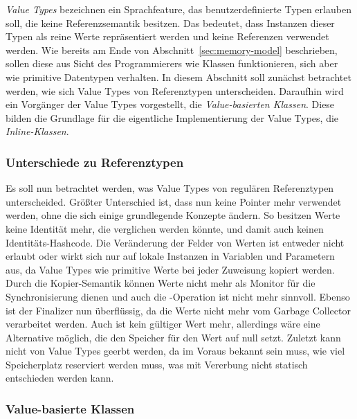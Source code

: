 \emph{Value Types} bezeichnen ein Sprachfeature, das benutzerdefinierte Typen erlauben soll, die keine Referenzsemantik besitzen.
Das bedeutet, dass Instanzen dieser Typen als reine Werte repräsentiert werden und keine Referenzen verwendet werden.
Wie bereits am Ende von Abschnitt~\ref{sec:memory-model} beschrieben, sollen diese aus Sicht des Programmierers wie Klassen funktionieren, sich aber wie primitive Datentypen verhalten.
In diesem Abschnitt soll zunächst betrachtet werden, wie sich Value Types von Referenztypen unterscheiden.
Daraufhin wird ein Vorgänger der Value Types vorgestellt, die \emph{Value-basierten Klassen}.
Diese bilden die Grundlage für die eigentliche Implementierung der Value Types, die \emph{Inline-Klassen}.

\subsubsection{Unterschiede zu Referenztypen}

Es soll nun betrachtet werden, was Value Types von regulären Referenztypen unterscheided.
Größter Unterschied ist, dass nun keine Pointer mehr verwendet werden, ohne die sich einige grundlegende Konzepte ändern.
So besitzen Werte keine Identität mehr, die verglichen werden könnte, und damit auch keinen Identitäts-Hashcode.
Die Veränderung der Felder von Werten ist entweder nicht erlaubt oder wirkt sich nur auf lokale Instanzen in Variablen und Parametern aus, da Value Types wie primitive Werte bei jeder Zuweisung kopiert werden.
Durch die Kopier-Semantik können Werte nicht mehr als Monitor für die Synchronisierung dienen und auch die -Operation ist nicht mehr sinnvoll.
Ebenso ist der Finalizer nun überflüssig, da die Werte nicht mehr vom Garbage Collector verarbeitet werden.
Auch  ist kein gültiger Wert mehr, allerdings wäre eine Alternative möglich, die den Speicher für den Wert auf null setzt.
Zuletzt kann nicht von Value Types geerbt werden, da im Voraus bekannt sein muss, wie viel Speicherplatz reserviert werden muss, was mit Vererbung nicht statisch entschieden werden kann.

\subsubsection{Value-basierte Klassen}

